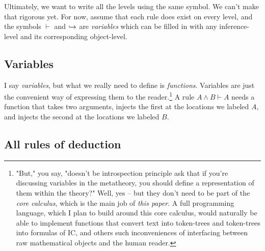 \documentclass{article}
\begin{document}
  Ultimately, we want to write all the levels using the same symbol. We can't make that rigorous yet. For now, assume that each rule does exist on every level, and the symbols $\vdash$ and $\hookrightarrow$ are \emph{variables} which can be filled in with any inference-level and its corresponding object-level.
  
  \subsection{Variables}
  
  I say \emph{variables}, but what we really need to define is \emph{functions}. Variables are just the convenient way of expressing them to the reader.\footnote{"But," you say, "doesn't be introspection principle ask that if you're discussing variables in the metatheory, you should define a representation of them within the theory?" Well, yes – but they don't need to be part of the \emph{core calculus}, which is the main job of \emph{this paper}. A full programming language, which I plan to build around this core calculus, would naturally be able to implement functions that convert text into token-trees and token-trees into formulas of IC, and others such inconveniences of interfacing between raw mathematical objects and the human reader.} A rule $A \wedge B \vdash A$ needs a function that takes two arguments, injects the first at the locations we labeled $A$, and injects the second at the locations we labeled $B$.
  
  
  \subsection{All rules of deduction}
\end{document}
